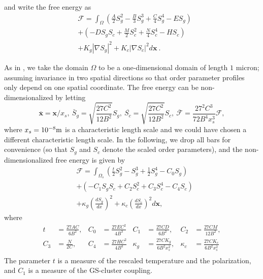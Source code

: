 \documentclass[reprint,amsfonts,amsmath,amssymb,aps,pre,floatfix,10pt]{revtex4-1}
\begin{document}
and write the free energy as
\begin{equation}
  \begin{aligned}
    & \mathcal{F}= \int_{\Omega}\left(\frac{A}{2} S_g^2-\frac{B}{3} S_g^3+\frac{C}{4} S_g^4 -  E S_g\right) \\
    & + \left(-D S_g S_c+\frac{M}{2} S_c^2+\frac{N}{4} S_c^4 - H S_c \right) \\
    & + K_g\left|\nabla S_g\right|^2+K_c\left|\nabla S_c\right|^2 d \mathbf{x} \ .
    \end{aligned}
\end{equation}

As in \cite{patranabish2019one_37}, we take the domain $\Omega$ to be a one-dimensional domain of length $1$ micron; assuming invariance in two spatial directions so that order parameter profiles only depend on one spatial coordinate.
The free energy can be non-dimensionalized by letting
\begin{equation*}
\textstyle{  \overline{\mathbf{x}}=\mathbf{x} / x_s,~\bar{S}_g=\sqrt{\frac{27 C^2}{12 B^2}} S_g,~\overline{S_c}=\sqrt{\frac{27 C^2}{12 B^2}} S_c,~ \overline{\mathcal{F}}=\frac{27^2 C^3}{72 B^4 x_s^3} \mathcal{F}, }
\end{equation*}
where $x_s = 10^{-8} {\rm m}$ is a characteristic length scale and we could have chosen a different characteristic length scale. 
In the following, we drop all bars for convenience (so that $S_g$ and $S_c$ denote
the scaled order parameters), and the non-dimensionalized free energy is given by
\begin{equation} \label{eq:energy}
  \begin{aligned}
    & \mathcal{F}= \int_{\Omega_s}\left(\frac{t}{2} S_g^2-S_g^3+\frac{1}{2} S_g^4 - C_0 S_g \right) \\ 
    & +\left(-C_1 S_g S_c+C_2 S_c^2+C_3 S_c^4 - C_4 S_c \right) \\
    &+\kappa_g\left(\frac{d S_g}{d x}\right)^2+\kappa_c\left(\frac{d S_c}{d x}\right)^2 d \mathbf{x},
    \end{aligned}
\end{equation}
where
\begin{equation*}
  \begin{aligned}
    t &=\frac{27 A C}{6 B^2}, & C_0 & = \frac{27  E C^2}{4 B^3}   %
    & C_1 &=\frac{27 C D}{6 B^2}, & C_2 & =\frac{27 C M}{12 B^2}, \\
    C_3 & =\frac{N}{2 C}, &
    C_4  & =   \frac{27  H C^2}{4 B^3 }  %
    & \kappa_g &=\frac{27 C K_g}{6 B^2 x_s^2}, & \kappa_c &=\frac{27 C K_c}{6 B^2 x_s^2} \\
    \end{aligned}
\end{equation*} 
The parameter $t$ is a measure of the rescaled temperature and the polarization, and $C_1$ is a measure of the GS-cluster coupling.
\end{document}
